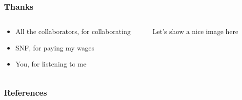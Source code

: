 \documentclass[aspectratio=169]{beamer}
\begin{document}
\begin{frame}
	\frametitle{Thanks}
	\begin{columns}
		\begin{column}{0.495\linewidth}
			\begin{itemize}
				\item All the collaborators, for collaborating
				\item SNF, for paying my wages
				\item<2-> You, for listening to me%
			\end{itemize}%
		\end{column}
		\begin{column}{0.495\linewidth}
			\centering
			Let's show a nice image here
		\end{column}
	\end{columns}	
\end{frame}

\begin{frame}
	\frametitle{References}
	\printbibliography
\end{frame}
\end{document}
